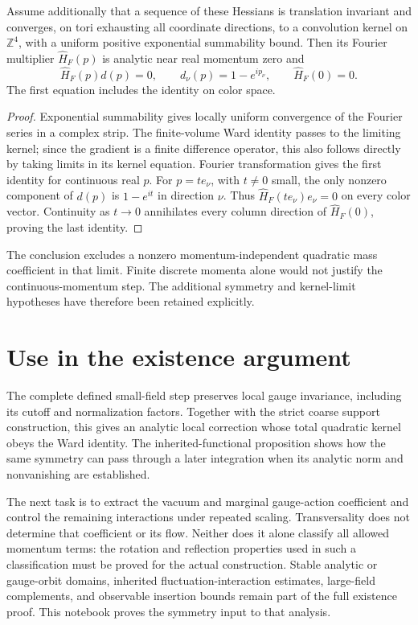 \begin{proposition}
\label{gc-zero-momentum}
Assume additionally that a sequence of these Hessians is translation
invariant and converges, on tori exhausting all coordinate directions,
to a convolution kernel on $\mathbb Z^4$, with a uniform positive
exponential summability bound. Then its Fourier multiplier
$\widehat H_F(p)$ is analytic near real momentum zero and
\begin{equation}\label{gc-zero}
 \widehat H_F(p)d(p)=0,\qquad
 d_\nu(p)=1-e^{ip_\nu},\qquad \widehat H_F(0)=0.
\end{equation}
The first equation includes the identity on color space.
\end{proposition}
\begin{proof}
Exponential summability gives locally uniform convergence of the
Fourier series in a complex strip. The finite-volume Ward identity
passes to the limiting kernel; since the gradient is a finite
difference operator, this also follows directly by taking limits
in its kernel equation. Fourier transformation gives the first
identity for continuous real $p$.
For $p=t e_\nu$, with $t\ne0$ small, the only nonzero component
of $d(p)$ is $1-e^{it}$ in direction $\nu$. Thus
$\widehat H_F(t e_\nu)e_\nu=0$ on every color vector.
Continuity as $t\to0$ annihilates every column direction of
$\widehat H_F(0)$, proving the last identity.
\end{proof}
The conclusion excludes a nonzero momentum-independent quadratic
mass coefficient in that limit. Finite discrete momenta alone would
not justify the continuous-momentum step. The additional symmetry
and kernel-limit hypotheses have therefore been retained explicitly.

\section{Use in the existence argument}
\label{gc-next}

The complete defined small-field step preserves local gauge
invariance, including its cutoff and normalization factors.
Together with the strict coarse support construction, this gives
an analytic local correction whose total quadratic kernel obeys
the Ward identity. The inherited-functional proposition shows
how the same symmetry can pass through a later integration when
its analytic norm and nonvanishing are established.

The next task is to extract the vacuum and marginal gauge-action
coefficient and control the remaining interactions under repeated
scaling. Transversality does not determine that coefficient or its
flow. Neither does it alone classify all allowed momentum terms:
the rotation and reflection properties used in such a classification
must be proved for the actual construction. Stable analytic or
gauge-orbit domains, inherited fluctuation-interaction estimates,
large-field complements, and observable insertion bounds remain
part of the full existence proof. This notebook proves the symmetry
input to that analysis.
